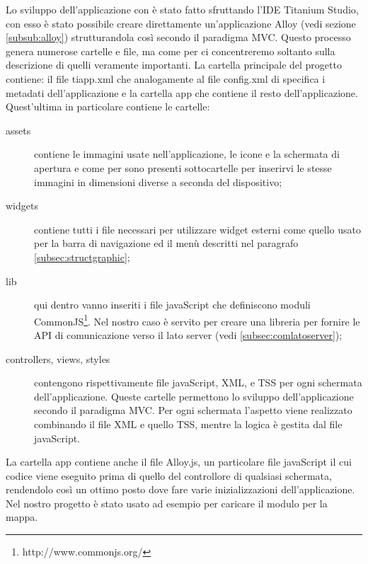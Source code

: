 			Lo sviluppo dell'applicazione con \tisdk{} è stato fatto sfruttando 
			l'IDE Titanium Studio, con esso è stato possibile creare direttamente 
			un'applicazione Alloy (vedi sezione \ref{subsub:alloy}) strutturandola 
			così secondo il paradigma MVC.
			Questo processo genera numerose cartelle e file, ma come per \pg{} ci 
			concentreremo soltanto sulla descrizione di quelli veramente importanti.
			La cartella principale del progetto contiene: il file tiapp.xml che 
			analogamente al file config.xml di \pg{} specifica i metadati dell'applicazione e 
			la cartella app che contiene il resto dell'applicazione.
			Quest'ultima in particolare contiene le cartelle: 
			\begin{description}
				\item[assets] contiene le immagini usate nell'applicazione, le 
							  icone e la schermata di apertura e come per \pg{} 
							  sono presenti sottocartelle per inserirvi le stesse 
							  immagini in dimensioni diverse a seconda del dispositivo;
				\item[widgets] contiene tutti i file necessari per utilizzare widget esterni 
							   come quello usato per la barra di navigazione ed il menù descritti 
							   nel paragrafo \ref{subsec:structgraphic};
				\item[lib] qui dentro vanno inseriti i file javaScript che definiscono 
						   moduli CommonJS\footnote{http://www.commonjs.org/}. Nel 
						   nostro caso è servito per creare una libreria per fornire 
						   le API di comunicazione verso il lato server (vedi \ref{subsec:comlatoserver});
				\item[controllers, views, styles] contengono rispettivamente file 
							javaScript, XML, e TSS per ogni schermata dell'applicazione. Queste cartelle
							permettono lo sviluppo dell'applicazione secondo il paradigma MVC. Per ogni 
							schermata l'aspetto viene realizzato combinando il file XML e quello TSS, 
							mentre la logica è gestita dal file javaScript.
			\end{description} 
			La cartella app contiene anche il file Alloy.js, un particolare file
			javaScript il cui codice viene eseguito prima di quello del controllore 
			di qualsiasi schermata, rendendolo così un ottimo posto dove fare 
			varie inizializzazioni dell'applicazione. Nel nostro progetto è 
			stato usato ad esempio per caricare il modulo per la mappa.
				
